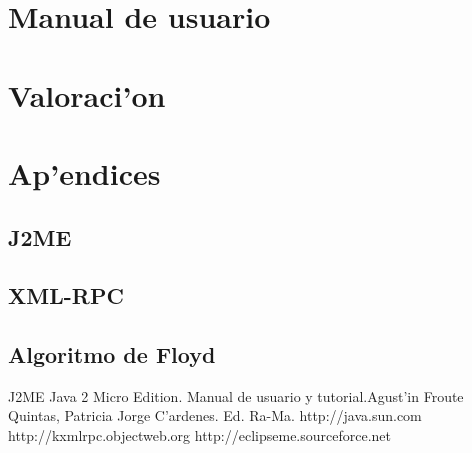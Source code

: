 \documentclass[a4paper,12pt]{article}
\begin{document}
\pagebreak

\section{Manual de usuario}

\pagebreak

\section{Valoraci'on}

\pagebreak

\section{Ap'endices}

	\subsection{J2ME}

	\subsection{XML-RPC}

	\subsection{Algoritmo de Floyd}

\pagebreak

\begin{thebibliography}{XXX}

	J2ME Java 2 Micro Edition. Manual de usuario y tutorial.Agust'in Froute Quintas, Patricia Jorge C'ardenes. Ed. Ra-Ma.
	http://java.sun.com
	http://kxmlrpc.objectweb.org
	  http://eclipseme.sourceforce.net

\end{thebibliography}
\end{document}
